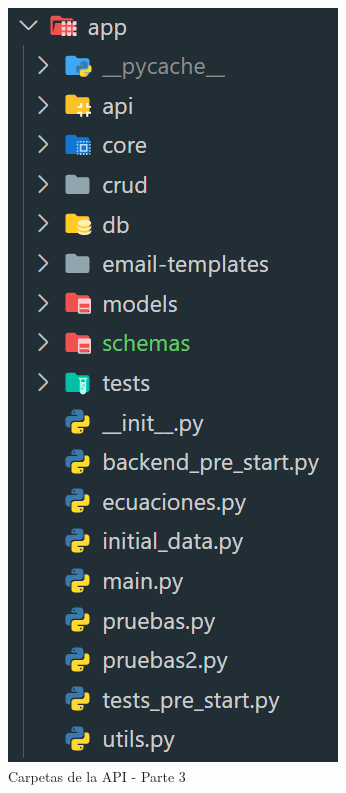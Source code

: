 \begin{figure}[!htb]
    \centering
    \includegraphics[scale=.9]{TT/img/implementacion/carpeta-api-3.png}
    \caption{Carpetas de la API - Parte 3}
    \label{graphic:carpetasapi3}    
\end{figure}


